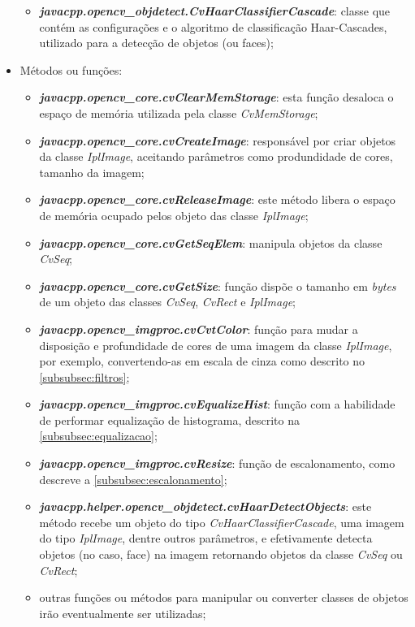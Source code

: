\begin{itemize}
\begin{itemize}
		\item \textbf{\textit{javacpp.opencv\_objdetect.CvHaarClassifierCascade}}: classe que contém as configurações e o algoritmo de classificação Haar-Cascades, utilizado para a detecção de objetos (ou faces);
	\end{itemize}

	\item Métodos ou funções:
	\begin{itemize}		
		\item \textbf{\textit{javacpp.opencv\_core.cvClearMemStorage}}: esta função desaloca o espaço de memória utilizada pela classe \textit{CvMemStorage};
		
		\item \textbf{\textit{javacpp.opencv\_core.cvCreateImage}}: responsável por criar objetos da classe \textit{IplImage}, aceitando parâmetros como produndidade de cores, tamanho da imagem;
		
		\item \textbf{\textit{javacpp.opencv\_core.cvReleaseImage}}: este método libera o espaço de memória ocupado pelos objeto das classe \textit{IplImage};

		\item \textbf{\textit{javacpp.opencv\_core.cvGetSeqElem}}: manipula objetos da classe \textit{CvSeq};
		
		\item \textbf{\textit{javacpp.opencv\_core.cvGetSize}}: função dispõe o tamanho em \textit{bytes} de um objeto das classes \textit{CvSeq}, \textit{CvRect} e \textit{IplImage};		
		
		\item \textbf{\textit{javacpp.opencv\_imgproc.cvCvtColor}}: função para mudar a disposição e profundidade de cores de uma imagem da classe \textit{IplImage}, por exemplo, convertendo-as em escala de cinza como descrito no \autoref{subsubsec:filtros};
		
		\item \textbf{\textit{javacpp.opencv\_imgproc.cvEqualizeHist}}: função com a habilidade de performar equalização de histograma, descrito na \autoref{subsubsec:equalizacao};
		
		\item \textbf{\textit{javacpp.opencv\_imgproc.cvResize}}: função de escalonamento, como descreve a \autoref{subsubsec:escalonamento};

		\item \textbf{\textit{javacpp.helper.opencv\_objdetect.cvHaarDetectObjects}}: este método recebe um objeto do tipo \textit{CvHaarClassifierCascade}, uma imagem do tipo \textit{IplImage}, dentre outros parâmetros, e efetivamente detecta objetos (no caso, face) na imagem retornando objetos da classe \textit{CvSeq} ou \textit{CvRect};
		
		\item outras funções ou métodos para manipular ou converter classes de objetos irão eventualmente ser utilizadas;
	\end{itemize}	
\end{itemize}

